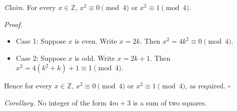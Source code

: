 \textit{Claim.} For every $x \in \mathbb{Z}$, $x^{2} \equiv 0 \pmod{4}$ or $x^{2} \equiv 1 \pmod{4}$.

\textit{Proof.}

\begin{itemize}
  \item Case 1: Suppose $x$ is even.
    Write $x = 2k$.
    Then $x^{2} = 4k^{2} \equiv 0 \pmod{4}$.
  \item Case 2: Suppose $x$ is odd.
    Write $x = 2k + 1$.
    Then $x^{2} = 4(k^{2} + k) + 1 \equiv 1 \pmod{4}$.
\end{itemize}

Hence for every $x \in \mathbb{Z}$, $x^{2} \equiv 0 \pmod{4}$ or $x^{2} \equiv 1 \pmod{4}$, as required. \hfill$\square$

\textit{Corollary.} No integer of the form $4m + 3$ is a sum of two squares.